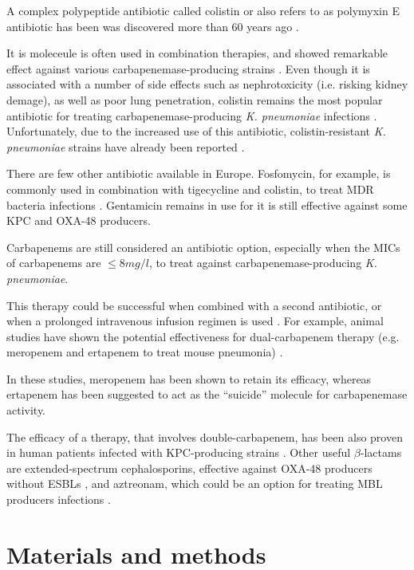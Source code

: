 \documentclass[11pt]{report}
\begin{document}
A complex polypeptide antibiotic called colistin or also refers to as polymyxin E antibiotic has been was discovered more than 60 years ago \cite{karaiskos2014multidrug, rodriguez2015diagnosis}.

It is moleceule is often used in combination therapies, and showed remarkable effect against various carbapenemase-producing strains \cite{falagas2013antibiotic, temkin2014carbapenem}.
Even though it is associated with a number of side effects such as nephrotoxicity (i.e. risking kidney demage), as well as poor lung penetration, colistin remains the most popular antibiotic for treating carbapenemase-producing \emph{K. pneumoniae} infections \cite{karaiskos2014multidrug, rodriguez2015diagnosis}.
Unfortunately, due to the increased use of this antibiotic, 
colistin-resistant \emph{K. pneumoniae} strains have already been reported \cite{mammina2012ongoing}.

There are few other antibiotic available in Europe. Fosfomycin, for example, is commonly used in combination with tigecycline and colistin, to treat MDR bacteria infections \cite{pontikis2014outcomes}.
Gentamicin remains in use for it is still effective against some KPC and OXA-48 producers.

Carbapenems are still considered an antibiotic option, especially when the MICs of carbapenems are $\le 8mg/l$, to treat against carbapenemase-producing \emph{K. pneumoniae}.

This therapy could be successful when combined with a second antibiotic, or when a prolonged intravenous infusion regimen is used \cite{tzouvelekis2014treating, daikos2014carbapenemase, tumbarello2012predictors}.
For example, animal studies have shown the potential effectiveness for dual-carbapenem therapy (e.g. meropenem and ertapenem to treat mouse pneumonia) 
\cite{wiskirchen2014vivo}.

In these studies, meropenem has been shown to retain its efficacy, whereas ertapenem has been suggested to act as the ``suicide'' molecule for carbapenemase activity.

The efficacy of a therapy, that involves double-carbapenem, has been also proven in human patients infected with KPC-producing strains \cite{giamarellou2013effectiveness}.
Other useful $\beta$-lactams are extended-spectrum cephalosporins, effective against OXA-48 producers without ESBLs \cite{mimoz2012broad}, and aztreonam, which could be an option for treating MBL producers infections \cite{nordmann2011emerging}.

\chapter{Materials and methods}
\end{document}
